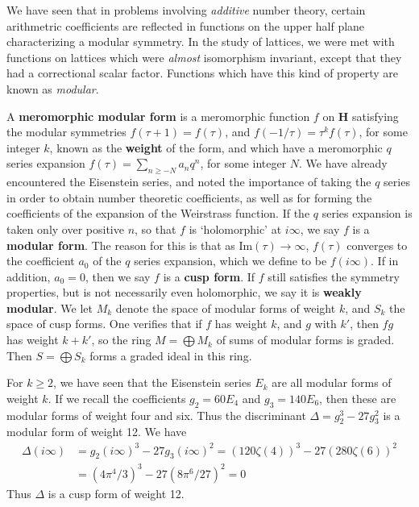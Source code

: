 We have seen that in problems involving {\it additive} number theory, certain arithmetric coefficients are reflected in functions on the upper half plane characterizing a modular symmetry. In the study of lattices, we were met with functions on lattices which were {\it almost} isomorphism invariant, except that they had a correctional scalar factor. Functions which have this kind of property are known as {\it modular}.

A {\bf meromorphic modular form} is a meromorphic function $f$ on $\mathbf{H}$ satisfying the modular symmetries $f(\tau+1) = f(\tau)$, and $f(-1/\tau) = \tau^k f(\tau)$, for some integer $k$, known as the {\bf weight} of the form, and which have a meromorphic $q$ series expansion $f(\tau) = \sum_{n \geq -N} a_n q^n$, for some integer $N$. We have already encountered the Eisenstein series, and noted the importance of taking the $q$ series in order to obtain number theoretic coefficients, as well as for forming the coefficients of the expansion of the Weirstrass function. If the $q$ series expansion is taken only over positive $n$, so that $f$ is `holomorphic' at $i \infty$, we say $f$ is a {\bf modular form}. The reason for this is that as $\text{Im}(\tau) \to \infty$, $f(\tau)$ converges to the coefficient $a_0$ of the $q$ series expansion, which we define to be $f(i \infty)$. If in addition, $a_0 = 0$, then we say $f$ is a {\bf cusp form}. If $f$ still satisfies the symmetry properties, but is not necessarily even holomorphic, we say it is {\bf weakly modular}. We let $M_k$ denote the space of modular forms of weight $k$, and $S_k$ the space of cusp forms. One verifies that if $f$ has weight $k$, and $g$ with $k'$, then $fg$ has weight $k + k'$, so the ring $M = \bigoplus M_k$ of sums of modular forms is graded. Then $S = \bigoplus S_k$ forms a graded ideal in this ring.

\begin{example}
    For $k \geq 2$, we have seen that the Eisenstein series $E_k$ are all modular forms of weight $k$. If we recall the coefficients $g_2 = 60 E_4$ and $g_3 = 140 E_6$, then these are modular forms of weight four and six. Thus the discriminant $\Delta = g_2^3 - 27 g_3^2$ is a modular form of weight 12. We have
    \begin{align*}
        \Delta(i \infty) &= g_2(i \infty)^3 - 27 g_3(i \infty)^2 =  (120 \zeta(4))^3 - 27 (280 \zeta(6))^2\\
        &= (4\pi^4/3)^3 - 27 (8 \pi^6/27)^2 = 0
    \end{align*}
    Thus $\Delta$ is a cusp form of weight 12.
\end{example}

